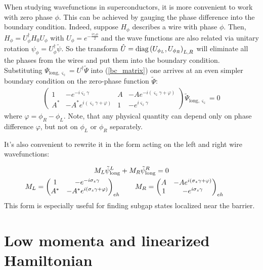 When studying wavefunctions in superconductors, it is more convenient to work with zero phase $ \phi $. This can be achieved by gauging the phase difference into the boundary condition. Indeed, suppose $ H_{\phi} $ describes a wire with phase $ \phi $. Then, $ H_{\phi}=U_{\phi}^{\dagger}H_{0}U_{\phi} $ with $ U_{\phi}=e^{-\frac{i\tau_z \phi}{2}}$ and the wave functions are also related via unitary rotation $ \psi_{\phi}=U_{\phi}^{\dagger}\tilde{\psi} $. So the transform $ \hat{U}=\mathrm{diag}\left(U_{\phi_{L}},U_{\phi_{R}}\right)_{L,R}$  will eliminate all the phases from the wires and put them into the boundary condition. Substituting $ \Psi_{\mathrm{long},\varsigma_{z}}=U^{\dagger}\tilde{\Psi} $ into (\ref{bc_matrix}) one arrives at an even simpler boundary condition on the zero-phase function $ \tilde{\Psi} $:
\begin{gather}
\label{bc_matrix_phases}
\begin{pmatrix}1 & -e^{-i\varsigma_{z}\gamma} & A & -Ae^{-i\left(\varsigma_{z}\gamma+\varphi\right)}\\
A^{*} & -A^{*}e^{i\left(\varsigma_{z}\gamma+\varphi\right)} & 1 & -e^{i\varsigma_{z}\gamma}
\end{pmatrix}
\tilde{\Psi}_{\mathrm{long}, \varsigma_{z}}=0
\end{gather}
where $ \varphi=\phi_R-\phi_L $. Note, that any physical quantity can depend only on phase difference $ \varphi $,  but not on $ \phi_L $ or $ \phi_R $ separately.

It's also convenient to rewrite it in the form acting on the left and right wire wavefunctions: 

\begin{gather}
\label{bc_matrix_LR}
M_L\tilde{\psi}_{\mathrm{long}}^L
+
M_R\tilde{\psi}_{\mathrm{long}}^R
=
0
\nonumber
\\
M_L
=
	\begin{pmatrix}
	1 & -e^{-i\sigma_z\gamma}
	\\
	A^* & -A^* e^{i\left(\sigma_z\gamma+\varphi\right)}
	\end{pmatrix}_{eh}
	\qquad
M_R
=
	\begin{pmatrix}
	A & -A e^{i\left(\sigma_z\gamma+\varphi\right)}
	\\
1 & -e^{i\sigma_z\gamma}
\end{pmatrix}_{eh}
\qquad	
\end{gather}
This form is especially useful for finding subgap states localized near the barrier.
\section{Low momenta and linearized Hamiltonian}
\label{sec:linearized_hamiltonian}

